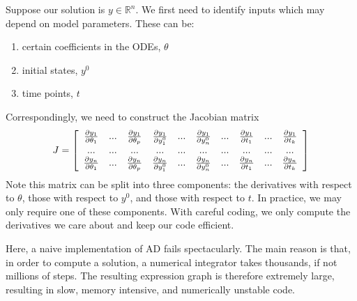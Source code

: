 \documentclass[11pt]{article}
\begin{document}
Suppose our solution is $y \in \mathbb R^n$. 
We first need to identify inputs which may depend on model parameters.
These can be:
%
\begin{enumerate}
  \item certain coefficients in the ODEs, $\theta$
  \item initial states, $y^0$
  \item time points, $t$
\end{enumerate}
%
Correspondingly, we need to construct the Jacobian matrix
%
\begin{eqnarray*}
     J = \left[\begin{array}{c c c c c c c c c c}
	  \frac{\partial y_1}{\partial \theta_1} & . . . & \frac{\partial y_1}{\partial \theta_p} & \frac{\partial y_1}{\partial y_1^0} &...& \frac{\partial y_1}{\partial y_n^0} & ... &  \frac{\partial y_1}{\partial t_1} & ... & \frac{\partial y_1}{\partial t_k} \\
	    . . . & . . . & . . . & ... & ... & ... & ... & ... & ... & ... \\
	  \frac{\partial y_n}{\partial \theta_1} & . . . & \frac{\partial y_n}{\partial \theta_p} & \frac{\partial y_n}{\partial y_1^0} &...& \frac{\partial y_n}{\partial y_n^0} & ... &  \frac{\partial y_n}{\partial t_1} & ... & \frac{\partial y_n}{\partial t_k}
	\end{array}\right] 
\end{eqnarray*}
%
Note this matrix can be split into three components: the derivatives with respect to $\theta$, those with respect to $y^0$,
and those with respect to $t$. In practice, we may only require one of these components.
With careful coding, we only compute the derivatives we care about and keep our code efficient.

Here, a naive implementation of AD fails spectacularly.
The main reason is that, in order to compute a solution, a numerical integrator takes thousands,
if not millions of steps.
The resulting expression graph is therefore extremely large, resulting in slow, memory intensive,
and numerically unstable code.
\end{document}

